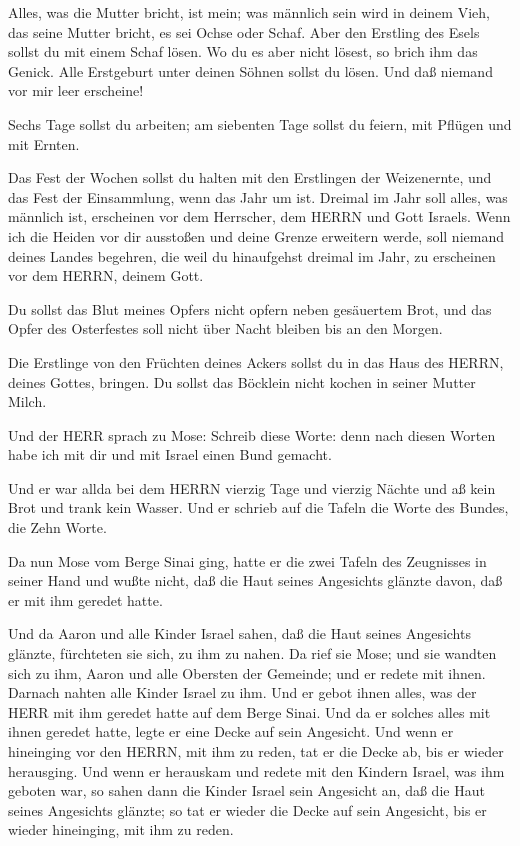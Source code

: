  Alles, was die Mutter bricht, ist mein; was männlich sein
wird in deinem Vieh, das seine Mutter bricht, es sei Ochse oder Schaf.
 Aber den Erstling des Esels sollst du mit einem Schaf
lösen. Wo du es aber nicht lösest, so brich ihm das Genick. Alle
Erstgeburt unter deinen Söhnen sollst du lösen. Und daß niemand vor mir
leer erscheine!

 Sechs Tage sollst du arbeiten; am siebenten Tage sollst du
feiern, mit Pflügen und mit Ernten.

 Das Fest der Wochen sollst du halten mit den Erstlingen
der Weizenernte, und das Fest der Einsammlung, wenn das Jahr um ist.
 Dreimal im Jahr soll alles, was männlich ist, erscheinen
vor dem Herrscher, dem HERRN und Gott Israels.  Wenn ich
die Heiden vor dir ausstoßen und deine Grenze erweitern werde, soll
niemand deines Landes begehren, die weil du hinaufgehst dreimal im Jahr,
zu erscheinen vor dem HERRN, deinem Gott.

 Du sollst das Blut meines Opfers nicht opfern neben
gesäuertem Brot, und das Opfer des Osterfestes soll nicht über Nacht
bleiben bis an den Morgen.

 Die Erstlinge von den Früchten deines Ackers sollst du in
das Haus des HERRN, deines Gottes, bringen. Du sollst das Böcklein nicht
kochen in seiner Mutter Milch.

 Und der HERR sprach zu Mose: Schreib diese Worte: denn
nach diesen Worten habe ich mit dir und mit Israel einen Bund gemacht.

 Und er war allda bei dem HERRN vierzig Tage und vierzig
Nächte und aß kein Brot und trank kein Wasser. Und er schrieb auf die
Tafeln die Worte des Bundes, die Zehn Worte.

 Da nun Mose vom Berge Sinai ging, hatte er die zwei Tafeln
des Zeugnisses in seiner Hand und wußte nicht, daß die Haut seines
Angesichts glänzte davon, daß er mit ihm geredet hatte.

 Und da Aaron und alle Kinder Israel sahen, daß die Haut
seines Angesichts glänzte, fürchteten sie sich, zu ihm zu nahen.
 Da rief sie Mose; und sie wandten sich zu ihm, Aaron und
alle Obersten der Gemeinde; und er redete mit ihnen. 
Darnach nahten alle Kinder Israel zu ihm. Und er gebot ihnen alles, was
der HERR mit ihm geredet hatte auf dem Berge Sinai.  Und da
er solches alles mit ihnen geredet hatte, legte er eine Decke auf sein
Angesicht.  Und wenn er hineinging vor den HERRN, mit ihm
zu reden, tat er die Decke ab, bis er wieder herausging. Und wenn er
herauskam und redete mit den Kindern Israel, was ihm geboten war,
 so sahen dann die Kinder Israel sein Angesicht an, daß die
Haut seines Angesichts glänzte; so tat er wieder die Decke auf sein
Angesicht, bis er wieder hineinging, mit ihm zu reden.

